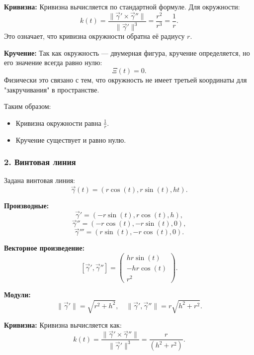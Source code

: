 \documentclass{article}
\begin{document}
        \textbf{Кривизна:}
        Кривизна вычисляется по стандартной формуле. Для окружности:
        \[
        k(t) = \frac{\|\vec{\gamma}' \times \vec{\gamma}''\|}{\|\vec{\gamma}'\|^3} = \frac{r^2}{r^3} = \frac{1}{r}.
        \]
        Это означает, что кривизна окружности обратна её радиусу $r$.
        
        \textbf{Кручение:}
        Так как окружность — двумерная фигура, кручение определяется, но его значение всегда равно нулю:
        \[
        \Xi(t) = 0.
        \]
        Физически это связано с тем, что окружность не имеет третьей координаты для "закручивания" в пространстве.
        
        Таким образом:
        \begin{itemize}
            \item Кривизна окружности равна $\frac{1}{r}$.
            \item Кручение существует и равно нулю.
        \end{itemize}
        
        \subsubsection*{2. Винтовая линия}
        
        Задана винтовая линия:
        \[
        \vec{\gamma}(t) = \left(r \cos(t), r \sin(t), ht\right).
        \]
        
        \textbf{Производные:}
        \[
        \vec{\gamma}' = \left(-r \sin(t), r \cos(t), h\right),
        \]
        \[
        \vec{\gamma}'' = \left(-r \cos(t), -r \sin(t), 0\right),
        \]
        \[
        \vec{\gamma}''' = \left(r \sin(t), -r \cos(t), 0\right).
        \]
        
        \textbf{Векторное произведение:}
        \[
       [ \vec{\gamma}' ,  \vec{\gamma}'' ] = 
        \begin{pmatrix}
        hr \sin(t) \\
        -hr \cos(t) \\
        r^2
        \end{pmatrix}.
        \]
        
        \textbf{Модули:}
        \[
        \|\vec{\gamma}' \| = \sqrt{r^2 + h^2}, \quad
        \|\vec{\gamma}',  \vec{\gamma}''\| = r\sqrt{h^2 + r^2}.
        \]
        
        \textbf{Кривизна:}
        Кривизна вычисляется как:
        \[
        k(t) = \frac{\|\vec{\gamma}' \times \vec{\gamma}''\|}{\|\vec{\gamma}'\|^3} = \frac{r}{\left(h^2 + r^2\right)}.
        \]
        
\end{document}
